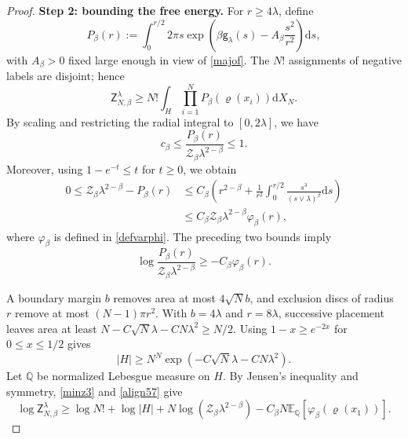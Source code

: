 \documentclass[a4paper,10pt,leqno]{amsart}
\numberwithin{equation}{section}
\newcommand{\dd}{\mathrm{d}}
\def\Esp{\mathbb{E}}
\def\mc{\mathcal}
\def\Z{\mathsf{Z}_{N,\beta}^{\lambda}}
\def\g{\mathsf{g}}
\begin{document}
\begin{proof}
  \noindent \textbf{Step 2: bounding the free energy.}
  For $r\ge4\lambda$, define
  \[
    P_\beta(r):=\int_0^{r/2}2\pi s\exp\left(\beta\g_\lambda(s)-A_\beta\frac{s^2}{r^2}\right)\dd s,
  \]
  with $A_\beta>0$ fixed large enough in view of \eqref{majof}. The $N!$ assignments of negative labels are disjoint; hence
  \begin{equation}\label{minz3}
    \Z\ge N!\int_H\prod_{i=1}^N P_\beta(\varrho(x_i))\dd X_N.
  \end{equation}
  By scaling and restricting the radial integral to $[0,2\lambda]$, we have
  \[
    c_\beta\le\frac{P_\beta(r)}{\mc Z_\beta\lambda^{2-\beta}}\le1.
  \]
  Moreover, using $1-e^{-t}\le t$ for $t\ge0$, we obtain
  \begin{align*}
    0\le\mc Z_\beta\lambda^{2-\beta}-P_\beta(r)
    &\le C_\beta\left(r^{2-\beta}+\frac1{r^2}\int_0^{r/2}\frac{s^3}{(s\vee\lambda)^\beta}\dd s\right)\\
    &\le C_\beta\mc Z_\beta\lambda^{2-\beta}\varphi_\beta(r),
  \end{align*}
  where $\varphi_\beta$ is defined in \eqref{defvarphi}. The preceding two bounds imply
  \begin{equation}\label{align57}
    \log\frac{P_\beta(r)}{\mc Z_\beta\lambda^{2-\beta}}\ge-C_\beta\varphi_\beta(r).
  \end{equation}

  A boundary margin $b$ removes area at most $4\sqrt N b$, and exclusion discs of radius $r$ remove at most $(N-1)\pi r^2$. With $b=4\lambda$ and $r=8\lambda$, successive placement leaves area at least $N-C\sqrt N\lambda-CN\lambda^2\ge N/2$. Using $1-x\ge e^{-2x}$ for $0\le x\le1/2$ gives
  \begin{equation}\label{eq:volume-lower}
    |H|\ge N^N\exp(-C\sqrt N\lambda-CN\lambda^2).
  \end{equation}
  Let $\mathbb Q$ be normalized Lebesgue measure on $H$. By Jensen's inequality and symmetry, \eqref{minz3} and \eqref{align57} give
  \begin{equation}\label{eq:Jensen}
    \log\Z\ge\log N!+\log|H|+N\log(\mc Z_\beta\lambda^{2-\beta})
    -C_\beta N\Esp_{\mathbb Q}[\varphi_\beta(\varrho(x_1))].
  \end{equation}


\end{proof}
\end{document}
